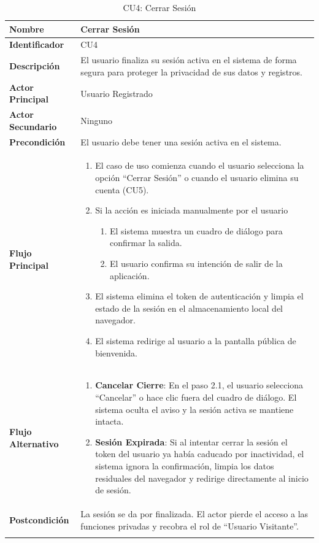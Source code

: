 \begin{xltabular}{\textwidth}{|>{\bfseries}p{3.5cm}|X|}
    Nombre & Cerrar Sesión \\ \hline
    Identificador & CU4 \\ \hline
    Descripción & El usuario finaliza su sesión activa en el sistema de forma segura para proteger la privacidad de sus datos y registros. \\ \hline
    Actor Principal & Usuario Registrado \\ \hline
    Actor Secundario & Ninguno \\ \hline
    Precondición & El usuario debe tener una sesión activa en el sistema. \\ \hline
    Flujo Principal & 
    \begin{enumerate}[leftmargin=0.5cm, topsep=0pt, partopsep=0pt, parsep=0pt, itemsep=4pt]
        \item El caso de uso comienza cuando el usuario selecciona la opción ``Cerrar Sesión'' o cuando el usuario elimina su cuenta (CU5).
        \item Si la acción es iniciada manualmente por el usuario
            \begin{enumerate}[label=\theenumi.\arabic*, leftmargin=0.6cm, topsep=2pt, itemsep=2pt]
                \item El sistema muestra un cuadro de diálogo para confirmar la salida.
                \item El usuario confirma su intención de salir de la aplicación.
            \end{enumerate}
        \item El sistema elimina el token de autenticación y limpia el estado de la sesión en el almacenamiento local del navegador.
        \item El sistema redirige al usuario a la pantalla pública de bienvenida.
    \end{enumerate}
    \\ \hline
    Flujo Alternativo & 
    \begin{enumerate}[leftmargin=0.5cm, topsep=0pt, partopsep=0pt, parsep=0pt, itemsep=4pt]
        \item \textbf{Cancelar Cierre}: En el paso 2.1, el usuario selecciona ``Cancelar'' o hace clic fuera del cuadro de diálogo. El sistema oculta el aviso y la sesión activa se mantiene intacta.
        \item \textbf{Sesión Expirada}: Si al intentar cerrar la sesión el token del usuario ya había caducado por inactividad, el sistema ignora la confirmación, limpia los datos residuales del navegador y redirige directamente al inicio de sesión.
    \end{enumerate}
    \\ \hline
    Postcondición & La sesión se da por finalizada. El actor pierde el acceso a las funciones privadas y recobra el rol de ``Usuario Visitante''. \\ \hline

    \caption{CU4: Cerrar Sesión}
    \label{tab:esp_cu4} \\
\end{xltabular}
\endgroup


